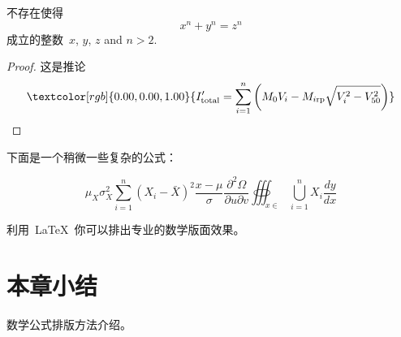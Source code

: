 \begin{theorem}[\heiti 费马]
  {\upshape\kaishu 不存在使得~
    \begin{equation}
      x^n+y^n=z^n
    \end{equation}
    成立的整数~$x$, $y$, $z$ and $n>2$. }
\end{theorem}

\begin{proof}
  {\upshape\kaishu 这是推论
    \begin{equation}
      \textcolor[rgb]{0.00,0.00,1.00}{
      I'_{{\rm{total}}} = \sum\limits_{i = 1}^n
      {\left( {M_0 V_i - M_{i{\rm{rp}}} \sqrt{V_i^2 - V_{50}^2}}\right)}}
    \end{equation}}
\end{proof}

下面是一个稍微一些复杂的公式：

\begin{equation}
  {\mu _X}\sigma _X^2\sum\limits_{i = 1}^n {{{({X_i} - \bar X)}^2}} \frac{{x - \mu }}{\sigma }\frac{{{\partial ^2}\Omega }}{{\partial u\partial v}}\oiiint\nolimits_{x \in }
  {\bigcup\limits_{i = 1}^n {{X_i}} \frac{{dy}}{{dx}}}
\end{equation}

利用~\LaTeX~你可以排出专业的数学版面效果。


\section*{本章小结}
数学公式排版方法介绍。
